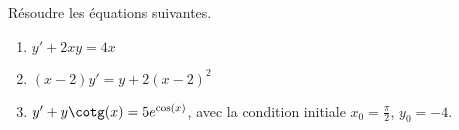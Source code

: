 \begin{exercice}\label{exoEquaDiff0003}

Résoudre les équations suivantes.
\begin{enumerate}

\item
$y'+2xy=4x$
\item
$(x-2)y'=y+2(x-2)^2$
\item
$y'+y\cotg(x)=5 e^{\cos(x)}$, avec la condition initiale $x_0=\frac{ \pi }{2}$, $y_0=-4$.

\end{enumerate}

\end{exercice}
